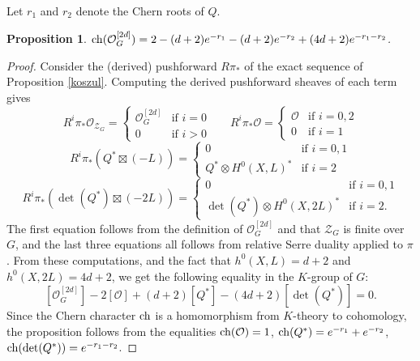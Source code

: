 \documentclass{amsart}
\newtheorem{proposition}[theorem]{Proposition}
\theoremstyle{definition}
\newcommand{\C}{\mathbb{C}}
\newcommand{\twopartdef}[4]
{
	\left\{
		\begin{array}{ll}
			#1 & \mbox{if } #2 \\
			#3 & \mbox{if } #4
		\end{array}
	\right.
}
\begin{document}
%
%

Let $r_1$ and $r_2$ denote the Chern roots of $Q$. 

\begin{proposition} ${\rm ch}(\mathcal{O}_G^{[2d]}) = 2-(d+2)e^{-r_1}-(d+2)e^{-r_2}+(4d+2)e^{-r_1-r_2}$. \end{proposition}

\begin{proof} Consider the (derived) pushforward $R\pi_*$
of the exact sequence of Proposition \ref{koszul}. Computing the
derived pushforward sheaves of each term gives
$$R^i\pi_* \mathcal{O}_{\mathcal{Z}_G}=\twopartdef{\mathcal{O}_G^{[2d]}}{i=0}{0}{i>0} \hspace{20pt}
R^i\pi_* \mathcal{O}=\twopartdef{\mathcal{O}}{i=0,2}{0}{i=1}$$
$$R^i\pi_*(Q^*\boxtimes (-L))=\twopartdef{0}{i=0,1}{Q^*\otimes H^0(X,L)^*}{i=2}$$
$$R^i\pi_*(\det(Q^*)\boxtimes (-2L))=\twopartdef{0}{i=0,1}{\det(Q^*)\otimes H^0(X,2L)^*}{i=2.}$$
The first equation follows from the definition of $\mathcal{O}_G^{[2d]}$ and that
$\mathcal{Z}_G$ is finite over $G$, and the last three equations all follows from relative Serre
duality applied to $\pi$. From these computations, and the fact that 
$h^0(X,L)=d+2$ and $h^0(X,2L)=4d+2$, we get the following equality in the $K$-group of $G$:
$$[\mathcal{O}_G^{[2d]}]-2[\mathcal{O}]+(d+2)[Q^*]-(4d+2)[\det(Q^*)]=0.$$
Since the Chern character ${\rm ch}$ is a homomorphism from $K$-theory to cohomology, the proposition
follows from the equalities
${\rm ch}(\mathcal{O})=1$, ${\rm ch}(Q^*)=e^{-r_1}+e^{-r_2}$, ${\rm ch}(\det(Q^*))=e^{-r_1-r_2}$. \end{proof}
\end{document}
